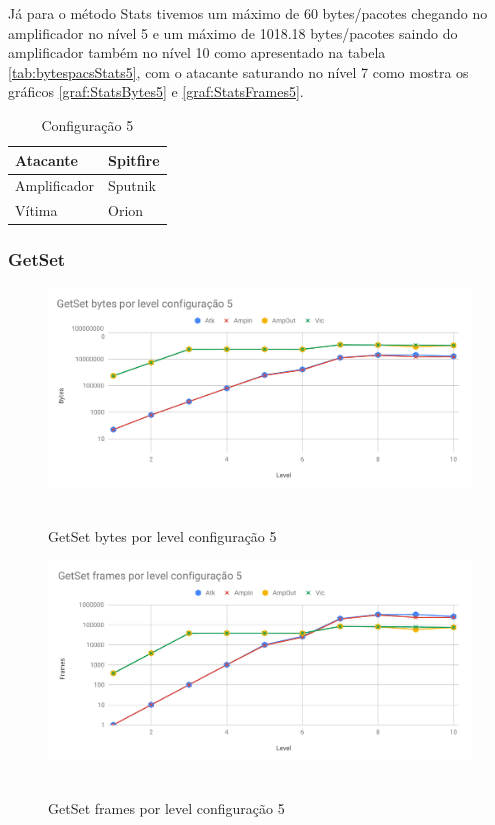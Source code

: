 Já para o método Stats tivemos um máximo de 60 bytes/pacotes chegando no amplificador no nível 5 e um máximo de 1018.18 bytes/pacotes saindo do amplificador também no nível 10 como apresentado na tabela \ref{tab:bytespacsStats5}, com o atacante saturando no nível 7 como mostra os gráficos \ref{graf:StatsBytes5} e \ref{graf:StatsFrames5}.

\begin{table}[H]
\centering
\caption{Configuração 5}
\begin{tabular}{|l|l|}
\hline
Atacante     & Spitfire \\ \hline
Amplificador & Sputnik  \\ \hline
Vítima       & Orion    \\ \hline
\end{tabular}
\end{table}

\subsubsection{GetSet}

\begin{figure}[H]
     \centering
     \label{graf:GetSetBytes5}
     \includegraphics[scale=0.6]{img/capturas/GetSetBLC5.pdf}\
     \caption{GetSet bytes por level configuração 5}
\end{figure}

\begin{figure}[H]
     \centering
     \label{graf:GetSetFrames5}
     \includegraphics[scale=0.6]{img/capturas/GetSetFLC5.pdf}\
     \caption{GetSet frames por level configuração 5}
\end{figure}

